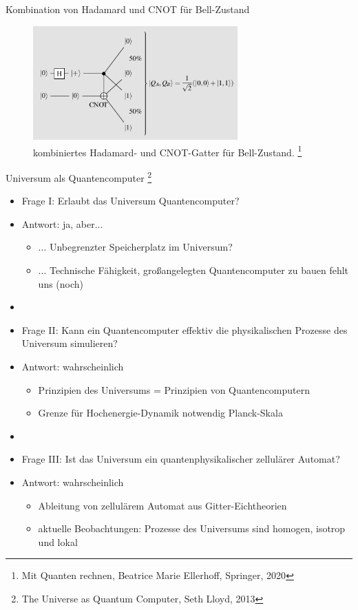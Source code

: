 \documentclass[aspectratio=1610, 9pt]{beamer}
\begin{document}
\begin{frame}{Kombination von Hadamard und CNOT für Bell-Zustand}
  \begin{figure}
      \includegraphics[width=0.7\textwidth]{images/kombi.png}
      \caption{kombiniertes Hadamard- und CNOT-Gatter für Bell-Zustand. \footnote[14]{Mit Quanten rechnen, Beatrice Marie Ellerhoff, Springer, 2020}}
  \end{figure}
\end{frame}

\begin{frame}{Universum als Quantencomputer \footnote[8]{The Universe as Quantum Computer, Seth Lloyd, 2013}}
  \begin{itemize}
    \item Frage I: Erlaubt das Universum Quantencomputer?
    \item Antwort: ja, aber...
    \begin{itemize}
      \item[] ... Unbegrenzter Speicherplatz im Universum?
      \item[] ... Technische Fähigkeit, großangelegten Quantencomputer zu bauen fehlt uns (noch)
    \end{itemize}
    \item[]
    \item Frage II: Kann ein Quantencomputer effektiv die physikalischen Prozesse des Universum simulieren?
    \item Antwort: wahrscheinlich
    \begin{itemize}
      \item[] Prinzipien des Universums = Prinzipien von Quantencomputern
      \item[] Grenze für Hochenergie-Dynamik notwendig \rightarrow Planck-Skala
    \end{itemize}
    \item[]
    \item Frage III: Ist das Universum ein quantenphysikalischer zellulärer Automat?
    \item Antwort: wahrscheinlich
    \begin{itemize}
      \item[] Ableitung von zellulärem Automat aus Gitter-Eichtheorien
      \item[] aktuelle Beobachtungen: Prozesse des Universums sind homogen, isotrop und lokal
    \end{itemize}
  \end{itemize}

\end{frame}
\end{document}
